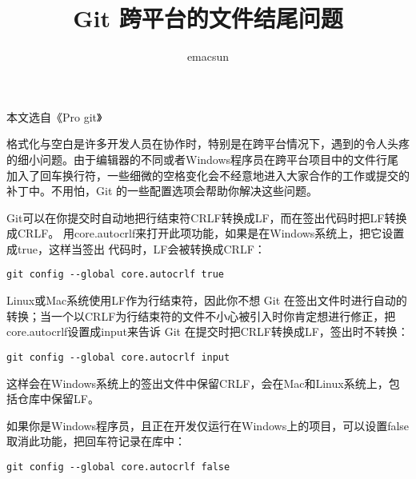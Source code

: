 \documentclass[10pt,a4paper,UTF8]{article}
\author{emacsun}
\date{}
\title{Git 跨平台的文件结尾问题}
\begin{document}
\maketitle
本文选自《Pro git》

格式化与空白是许多开发人员在协作时，特别是在跨平台情况下，遇到的令人头疼的细小问题。由于编辑器的不同或者Windows程序员在跨平台项目中的文件行尾加入了回车换行符，一些细微的空格变化会不经意地进入大家合作的工作或提交的补丁中。不用怕，Git 的一些配置选项会帮助你解决这些问题。

Git可以在你提交时自动地把行结束符CRLF转换成LF，而在签出代码时把LF转换成CRLF。
用core.autocrlf来打开此项功能，如果是在Windows系统上，把它设置成true，这样当签出
代码时，LF会被转换成CRLF：
\begin{verbatim}
git config --global core.autocrlf true
\end{verbatim}

Linux或Mac系统使用LF作为行结束符，因此你不想 Git 在签出文件时进行自动的转换；当一个以CRLF为行结束符的文件不小心被引入时你肯定想进行修正，把core.autocrlf设置成input来告诉 Git 在提交时把CRLF转换成LF，签出时不转换：
\begin{verbatim}
git config --global core.autocrlf input
\end{verbatim}

这样会在Windows系统上的签出文件中保留CRLF，会在Mac和Linux系统上，包括仓库中保留LF。

如果你是Windows程序员，且正在开发仅运行在Windows上的项目，可以设置false取消此功能，把回车符记录在库中：

\begin{verbatim}
git config --global core.autocrlf false
\end{verbatim}
\end{document}
